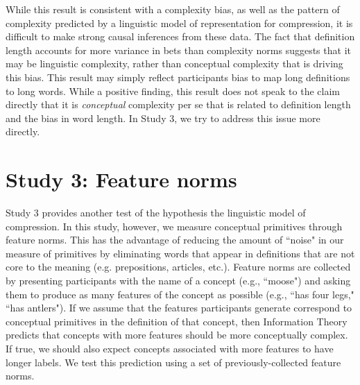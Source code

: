 While this result is consistent with a complexity bias, as well as the pattern of complexity predicted by a linguistic model of representation for compression, it is difficult to make strong causal inferences from these data. The fact that definition length accounts for more variance in bets than complexity norms suggests that it may be linguistic complexity, rather than conceptual complexity that is driving this bias. This result may simply reflect participants bias to map long definitions to long words. While a positive finding, this result does not speak to the claim directly that it is {\it conceptual} complexity per se that is related to definition length and the bias in word length. In Study 3, we try to address this issue more directly. 

\section{Study 3: Feature norms}
Study 3 provides another test of the hypothesis the linguistic model of compression. In this study, however, we measure conceptual primitives through feature norms. This has the advantage of reducing the amount of ``noise" in our measure of primitives by eliminating words that appear in definitions that are not core to the meaning (e.g. prepositions, articles, etc.). Feature norms are collected by presenting participants with the name of a concept (e.g., ``moose") and asking them to produce as many features of the concept as possible (e.g., ``has four legs," ``has antlers"). If we assume that the features participants generate correspond to conceptual primitives in the definition of that concept, then Information Theory predicts that concepts with more  features should be more conceptually complex. If true, we should also expect concepts associated with more features to have longer labels. We test this prediction using a set of previously-collected feature norms.

